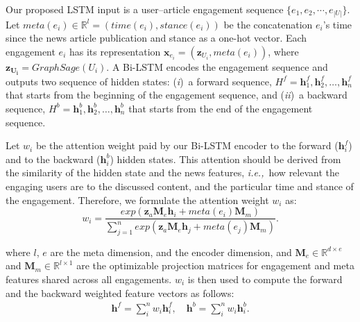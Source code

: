 \documentclass[sigconf,anonymous]{acmart}
\theoremstyle{definition}
\theoremstyle{hypothesis}
\begin{document}
Our proposed LSTM input is a user--article engagement sequence $\{e_1, e_2,\cdots,e_{|U|}\}$. Let $meta(e_i)\in \mathbb{R}^l=(time(e_i),stance(e_i))$ be the concatenation $e_i$'s time since the news article publication and stance as a one-hot vector. Each engagement $e_i$ has its representation $\boldsymbol{x}_{e_i}= (\boldsymbol{z}_{U_i}, meta(e_i))$,
where $\boldsymbol{z_{U_i}}=GraphSage(U_i)$. A Bi-LSTM encodes the engagement sequence and outputs two sequence of hidden states: (\emph{i})~a forward sequence,
$H^f={\boldsymbol{h}^f_1, \boldsymbol{h}^f_2,\ldots,
  \boldsymbol{h}^f_n}$ that starts from the beginning of the engagement sequence, and
(\emph{ii})~a backward sequence, $H^b={\boldsymbol{h}^b_1,
  \boldsymbol{h}^b_2,\ldots, \boldsymbol{h}^b_n}$ that starts from the
end of the engagement sequence. 

Let $w_i$ be the attention weight paid by our Bi-LSTM encoder to the forward ($\boldsymbol{h}^f_i$) and to the backward ($\boldsymbol{h}^b_i$) hidden states. This attention should be derived from the similarity of the hidden state and the news features, \textit{i.e.,}~how relevant the engaging users are to the discussed content, and the particular time and stance of the engagement. Therefore, we formulate the attention weight $w_i$ as:
\begin{equation}
    w_i = \frac{exp(\boldsymbol{z}_a \mathbf{M}_e  \boldsymbol{h}_i + meta(e_i) \mathbf{M}_m)}{\sum^n_{j=1}exp(\boldsymbol{z}_a \mathbf{M}_e \boldsymbol{h}_j + meta(e_j) \mathbf{M}_m)}.
\end{equation}

\noindent where $l$, $e$ are the meta dimension, and the encoder dimension, and $\mathbf{M}_e\in \mathbb{R}^{d\times e}$ and $\mathbf{M}_m\in \mathbb{R}^{l\times 1}$ are the optimizable projection matrices for engagement and meta features shared across all engagements. $w_i$ is then used to compute the forward and the backward weighted feature vectors as follows:
\begin{eqnarray}\label{eq:w_sum}
  \boldsymbol{h}^f=\sum^n_i w_i \boldsymbol{h}^f_i, 
  \quad\boldsymbol{h}^b=\sum^n_i w_i \boldsymbol{h}^b_i. 
\end{eqnarray}
\end{document}
